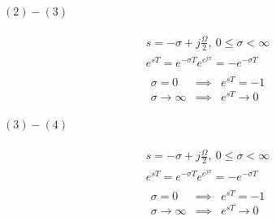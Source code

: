 \documentclass{article}
\begin{document}
	\paragraph{$(2) - (3)$}
		\begin{eqnarray*}
			&s=-\sigma + j\frac{\Omega}{2},\ 0\le \sigma < \infty& \\
			&e^{sT} = e^{-\sigma T}e^{e^{j\pi}} = -e^{-\sigma T}& \\
		\end{eqnarray*}
		\begin{eqnarray*}
			\sigma=0 &\implies& e^{sT}=-1 \\
			\sigma \to \infty &\implies& e^{sT} \to 0
		\end{eqnarray*}
	
	\paragraph{$(3) - (4)$}
	\begin{eqnarray*}
		&s=-\sigma + j\frac{\Omega}{2},\ 0\le \sigma < \infty& \\
		&e^{sT} = e^{-\sigma T}e^{e^{j\pi}} = -e^{-\sigma T}& \\
	\end{eqnarray*}
	\begin{eqnarray*}
		\sigma=0 &\implies& e^{sT}=-1 \\
		\sigma \to \infty &\implies& e^{sT} \to 0
	\end{eqnarray*}
	
\end{document}
